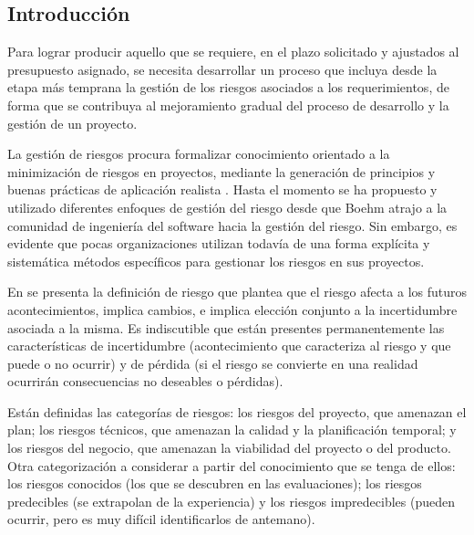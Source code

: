 		\subsection{Introducción}
        Para lograr producir aquello que se requiere, en el plazo solicitado y ajustados al presupuesto asignado, se necesita desarrollar
        un proceso que incluya desde la etapa más temprana la gestión de los riesgos asociados a los requerimientos, de forma que se contribuya al
        mejoramiento gradual del proceso de desarrollo y la gestión de un proyecto.
		\vspace{0.5cm}
		\par
        La gestión de riesgos procura formalizar conocimiento orientado a la minimización de riesgos en proyectos, mediante la
        generación de principios y buenas prácticas de aplicación realista \cite{etiqueta_riegos1}. Hasta el momento se ha propuesto
        y utilizado diferentes enfoques de gestión del riesgo desde que Boehm \cite{etiqueta_riegos2} atrajo a la comunidad de ingeniería del
        software hacia la gestión del riesgo. Sin embargo, es evidente que pocas organizaciones utilizan todavía de una forma explícita y sistemática
        métodos específicos para gestionar los riesgos en sus proyectos.
		\vspace{0.5cm}
		\par
        En \cite{etiqueta_riegos3} se presenta la definición de riesgo que plantea que el riesgo afecta a los futuros acontecimientos, implica
        cambios, e implica elección conjunto a la incertidumbre asociada a la misma. Es indiscutible que están presentes permanentemente las características de
        incertidumbre (acontecimiento que caracteriza al riesgo y que puede o no ocurrir) y de pérdida (si el riesgo se convierte en una realidad
        ocurrirán consecuencias no deseables o pérdidas).
		\vspace{0.5cm}
		\par
		Están definidas las categorías de riesgos: los riesgos del proyecto, que amenazan el plan; los riesgos técnicos, que amenazan la calidad y la
		planificación temporal; y los riesgos del negocio, que amenazan la viabilidad del proyecto o del producto. Otra categorización a considerar a
		partir del conocimiento que se tenga de ellos: los riesgos conocidos (los que se descubren en las evaluaciones); los riesgos predecibles (se
		extrapolan de la experiencia) y los riesgos impredecibles (pueden ocurrir, pero es muy difícil identificarlos de antemano).
		\vspace{0.5cm}
